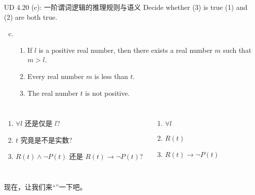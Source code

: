 \begin{frame}{}
  \begin{exampleblock}{UD 4.20 (c): 一阶谓词逻辑的推理规则与语义}
    Decide whether (3) is true  (1) and (2) are both true.

    \begin{enumerate}[(a)]
      \setcounter{enumi}{2}
      \item 
	\begin{enumerate}[(1)]
	  \item If $l$ is a positive real number, then there exists a real number $m$ such that $m > l$.
	  \item Every real number $m$ is less than $t$.
	  \item The real number $t$ is not positive.
	\end{enumerate}
    \end{enumerate}
  \end{exampleblock}

  \vspace{0.30cm}
  \pause

  \begin{columns}
      \begin{enumerate}[(1)]
	\pause
	\item $\forall l$ 还是仅是 $l$?
	\pause
	\item $t$ 究竟是不是实数?
	\pause
	\item $R(t) \land \lnot P(t)$ 还是 $R(t) \to \lnot P(t)$?
      \end{enumerate}
      \pause
      \begin{enumerate}[(1)]
	\item $\forall l$
	\item $R(t)$
	\item $R(t) \to \lnot P(t)$
      \end{enumerate}
  \end{columns}

  \pause
  \vspace{0.30cm}
  \begin{center}
    {现在，让我们来``''一下吧。}
  \end{center}
\end{frame}

